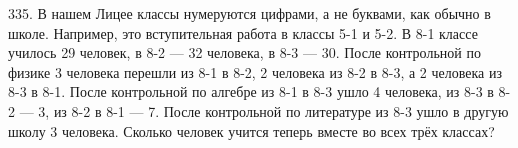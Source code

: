 335. В нашем Лицее классы нумеруются цифрами, а не буквами, как обычно в школе. Например, это вступительная работа в классы 5-1 и 5-2. В 8-1 классе училось 29 человек, в 8-2 --- 32 человека, в 8-3 --- 30. После контрольной по физике 3 человека перешли из 8-1 в 8-2, 2 человека из 8-2 в 8-3, а 2 человека из 8-3 в 8-1. После контрольной по алгебре из 8-1 в 8-3 ушло 4 человека, из 8-3 в 8-2 --- 3, из 8-2 в 8-1 --- 7. После контрольной по литературе из 8-3 ушло в другую школу 3 человека. Сколько человек учится теперь вместе во всех трёх классах?\\
